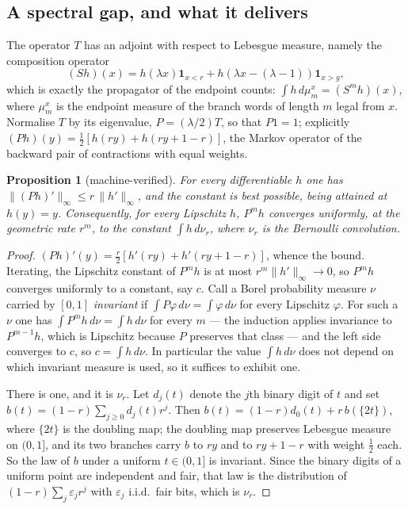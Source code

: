 \documentclass[11pt,reqno]{amsart}
\theoremstyle{plain}
\newtheorem{proposition}[theorem]{Proposition}
\theoremstyle{definition}
\theoremstyle{remark}
\begin{document}
\subsection{A spectral gap, and what it delivers}
The operator $T$ has an adjoint with respect to Lebesgue measure, namely the
composition operator
\[
  (Sh)(x)=h(\lambda x)\mathbf 1_{x<r}+h(\lambda x-(\lambda-1))\mathbf 1_{x>g},
\]
which is exactly the propagator of the endpoint counts: $\int h\,d\mu^x_m
=(S^mh)(x)$, where $\mu^x_m$ is the endpoint measure of the branch words of
length $m$ legal from $x$. Normalise $T$ by its eigenvalue, $P=(\lambda/2)T$,
so that $P1=1$; explicitly $(Ph)(y)=\tfrac12[h(ry)+h(ry+1-r)]$, the Markov
operator of the backward pair of contractions with equal weights.

\begin{proposition}[machine-verified]\label{prop:gap}
For every differentiable $h$ one has
$\|(Ph)'\|_\infty\leq r\,\|h'\|_\infty$, and the constant is best possible,
being attained at $h(y)=y$. Consequently, for every Lipschitz $h$,
$P^mh$ converges uniformly, at the geometric rate $r^m$, to the constant
$\int h\,d\nu_r$, where $\nu_r$ is the Bernoulli convolution.
\end{proposition}

\begin{proof}
$(Ph)'(y)=\tfrac r2[h'(ry)+h'(ry+1-r)]$, whence the bound. Iterating, the
Lipschitz constant of $P^mh$ is at most $r^m\|h'\|_\infty\to0$, so $P^mh$
converges uniformly to a constant, say $c$. Call a Borel probability measure
$\nu$ carried by $[0,1]$ \emph{invariant} if $\int P\varphi\,d\nu
=\int\varphi\,d\nu$ for every Lipschitz $\varphi$. For such a $\nu$ one has
$\int P^mh\,d\nu=\int h\,d\nu$ for every $m$ --- the induction applies
invariance to $P^{m-1}h$, which is Lipschitz because $P$ preserves that class
--- and the left side converges to $c$, so $c=\int h\,d\nu$. In particular the
value $\int h\,d\nu$ does not depend on which invariant measure is used, so it
suffices to exhibit one.

There is one, and it is $\nu_r$. Let $d_j(t)$ denote the $j$th binary
digit of $t$ and set $b(t)=(1-r)\sum_{j\geq0}d_j(t)r^j$. Then
$b(t)=(1-r)d_0(t)+r\,b(\{2t\})$, where $\{2t\}$ is the doubling map; the
doubling map preserves Lebesgue measure on $(0,1]$, and its two branches carry
$b$ to $ry$ and to $ry+1-r$ with weight $\tfrac12$ each. So the law of $b$
under a uniform $t\in(0,1]$ is invariant. Since the binary digits of a uniform
point are independent and fair, that law is the distribution of
$(1-r)\sum_j\varepsilon_jr^j$ with $\varepsilon_j$ i.i.d.\ fair bits, which is
$\nu_r$.
\end{proof}
\end{document}
